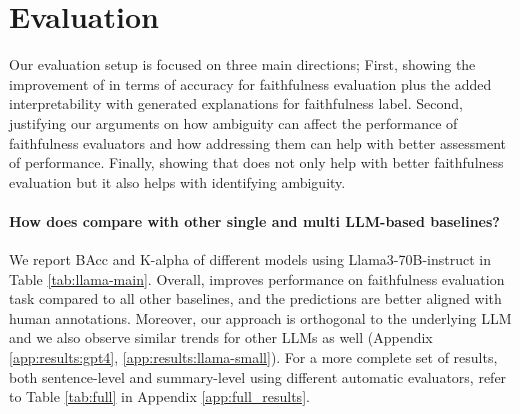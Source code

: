 \section{Evaluation}

Our evaluation setup is focused on three main directions; First, 
showing the improvement of \method in terms of accuracy for faithfulness evaluation plus the added interpretability with generated explanations for faithfulness label.
Second, justifying our arguments on how ambiguity can affect the performance of faithfulness evaluators and how addressing them can help with better assessment of performance.
Finally, showing that \method does not only help with better faithfulness evaluation but it also helps with identifying ambiguity.

\paragraph{How does \method compare with other single and multi LLM-based baselines?}
We report BAcc and K-alpha of different models using Llama3-70B-instruct in Table \ref{tab:llama-main}.
Overall, \method improves performance on faithfulness evaluation task compared to all other baselines, and the predictions are better aligned with human annotations.
Moreover, our approach is orthogonal to the underlying LLM and we also observe similar trends for other LLMs as well (Appendix \ref{app:results:gpt4}, \ref{app:results:llama-small}). %
%
For a more complete set of results, both sentence-level and summary-level using different automatic evaluators, refer to Table \ref{tab:full} in Appendix \ref{app:full_results}.

